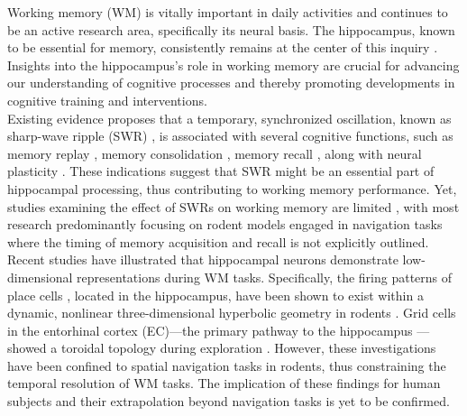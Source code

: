 Working memory (WM) is vitally important in daily activities and continues to be an active research area, specifically its neural basis. The hippocampus, known to be essential for memory, consistently remains at the center of this inquiry \cite{scoville_loss_1957} \cite{squire_legacy_2009}  \cite{boran_persistent_2019} \cite{kaminski_persistently_2017} \cite{kornblith_persistent_2017} \cite{faraut_dataset_2018} \cite{borders_hippocampus_2022} \cite{li_functional_2023} \cite{dimakopoulos_information_2022}. Insights into the hippocampus's role in working memory are crucial for advancing our understanding of cognitive processes and thereby promoting developments in cognitive training and interventions.
\\
\indent
Existing evidence proposes that a temporary, synchronized oscillation, known as sharp-wave ripple (SWR) \cite{buzsaki_hippocampal_2015}, is associated with several cognitive functions, such as memory replay \cite{wilson_reactivation_1994} \cite{nadasdy_replay_1999} \cite{lee_memory_2002} \cite{diba_forward_2007} \cite{davidson_hippocampal_2009}, memory consolidation \cite{girardeau_selective_2009} \cite{ego-stengel_disruption_2010} \cite{fernandez-ruiz_long-duration_2019} \cite{kim_corticalhippocampal_2022}, memory recall \cite{wu_hippocampal_2017} \cite{norman_hippocampal_2019} \cite{norman_hippocampal_2021}, along with neural plasticity \cite{behrens_induction_2005} \cite{norimoto_hippocampal_2018}. These indications suggest that SWR might be an essential part of hippocampal processing, thus contributing to working memory performance. Yet, studies examining the effect of SWRs on working memory are limited \cite{jadhav_awake_2012}, with most research predominantly focusing on rodent models engaged in navigation tasks where the timing of memory acquisition and recall is not explicitly outlined.
\\
\indent
Recent studies have illustrated that hippocampal neurons demonstrate low-dimensional representations during WM tasks. Specifically, the firing patterns of place cells \cite{okeefe_hippocampus_1971} \cite{okeefe_place_1976} \cite{ekstrom_cellular_2003} \cite{kjelstrup_finite_2008} \cite{harvey_intracellular_2009}, located in the hippocampus, have been shown to exist within a dynamic, nonlinear three-dimensional hyperbolic geometry in rodents \cite{zhang_hippocampal_2022}. Grid cells in the entorhinal cortex (EC)—the primary pathway to the hippocampus \cite{naber_reciprocal_2001} \cite{van_strien_anatomy_2009} \cite{strange_functional_2014}—showed a toroidal topology during exploration \cite{gardner_toroidal_2022}. However, these investigations have been confined to spatial navigation tasks in rodents, thus constraining the temporal resolution of WM tasks. The implication of these findings for human subjects and their extrapolation beyond navigation tasks is yet to be confirmed.
